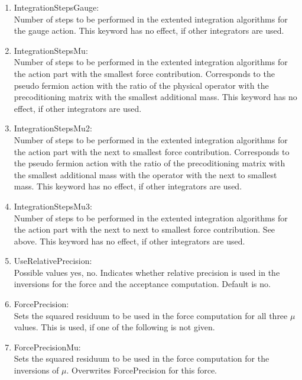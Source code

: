 \begin{enumerate}
\item {\ttfamily IntegrationStepsGauge}:\\
  Number of steps to be performed in the extented integration
  algorithms for the gauge action. This keyword has no effect, if
  other integrators are used.

\item {\ttfamily IntegrationStepsMu}:\\
  Number of steps to be performed in the extented integration
  algorithms for the action part with the smallest force
  contribution. Corresponds to the pseudo fermion action with the
  ratio of the physical operator with the precoditioning matrix with
  the smallest additional mass. This keyword has no effect, if
  other integrators are used.

\item {\ttfamily IntegrationStepsMu2}:\\
  Number of steps to be performed in the extented integration
  algorithms for the action part with the next to smallest force
  contribution. Corresponds to the pseudo fermion action with the
  ratio of the precoditioning matrix with the smallest additional mass
  with the operator with the next to smallest mass. This keyword has
  no effect, if other integrators are used.

\item {\ttfamily IntegrationStepsMu3}:\\
  Number of steps to be performed in the extented integration
  algorithms for the action part with the next to next to smallest force
  contribution. See above. This keyword has
  no effect, if other integrators are used.

\item {\ttfamily UseRelativePrecision}:\\
  Possible values {\ttfamily yes, no}. Indicates whether relative
  precision is used in the inversions for the force and the acceptance
  computation. Default is no.

\item {\ttfamily ForcePrecision}:\\
  Sets the squared residuum to be used in the force computation for
  all three $\mu$ values. This is used, if one of the following is not
  given.

\item {\ttfamily ForcePrecisionMu}:\\
  Sets the squared residuum to be used in the force computation for
  the inversions of $\mu$. Overwrites {\ttfamily ForcePrecision}
  for this force.


\end{enumerate}
